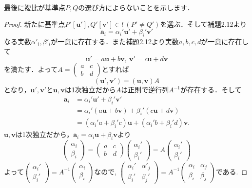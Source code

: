 \documentclass{jsarticle}
\theoremstyle{definition}
\numberwithin{theorem}{section}
\numberwithin{equation}{section}
\begin{document}
最後に複比が基準点$P,Q$の選び方によらないことを示します．
\begin{proof}
新たに基準点$P'[\bm{u}'],Q'[\bm{v}']\in l\ (P'\neq Q')$を選ぶ．そして補題2.12より
$$\bm{a}_i=\alpha_i' \bm{u}'+ \beta_i' \bm{v}'$$なる実数$\alpha'_i,\beta'_i$が一意に存在する．また補題2.12より実数$a,b,c,d$が一意に存在して
$$\bm{u}'=a\bm{u}+b\bm{v},\ \bm{v}'=c\bm{u}+d\bm{v}$$
を満たす．よって$A=\begin{pmatrix}
    a & c
    \\b & d
\end{pmatrix}$とすれば
$$(\bm{u}',\bm{v}')=(\bm{u},\bm{v})A$$
となり，$\bm{u}',\bm{v}'$と$\bm{u},\bm{v}$は1次独立だから$A$は正則で逆行列$A^{-1}$が存在する．そして
\begin{align*}
 \bm{a}_i&=\alpha_i' \bm{u}'+ \beta_i' \bm{v}'\\
 &=\alpha_i' (a\bm{u}+b\bm{v})+ \beta_i' (c\bm{u}+d\bm{v})\\
 &=(\alpha_i'a+\beta_i'c)\bm{u}+(\alpha_i'b+\beta_i'd)\bm{v} .   
\end{align*}
$\bm{u},\bm{v}$は1次独立だから，$\bm{a}_i=\alpha_i \bm{u}+ \beta_i \bm{v}$より
$$\begin{pmatrix}
    \alpha_i \\ \beta_i
\end{pmatrix}=
\begin{pmatrix}
    a & c \\
    b & d
\end{pmatrix}
\begin{pmatrix}
    \alpha_i' \\ \beta_i'
\end{pmatrix}=A\begin{pmatrix}
    \alpha_i' \\ \beta_i'
\end{pmatrix}$$
よって$\begin{pmatrix}
    \alpha_i' \\ \beta_i'
\end{pmatrix}=A^{-1}\begin{pmatrix}
    \alpha_i \\ \beta_i
\end{pmatrix}$なので,
$\begin{pmatrix}
    \alpha_i' & \alpha'_j
    \\ \beta_i' & \beta_j'
\end{pmatrix}=A^{-1}\begin{pmatrix}
   \alpha_i & \alpha_j
\\ \beta_i & \beta_j
\end{pmatrix}$である.

\end{proof}
\end{document}
